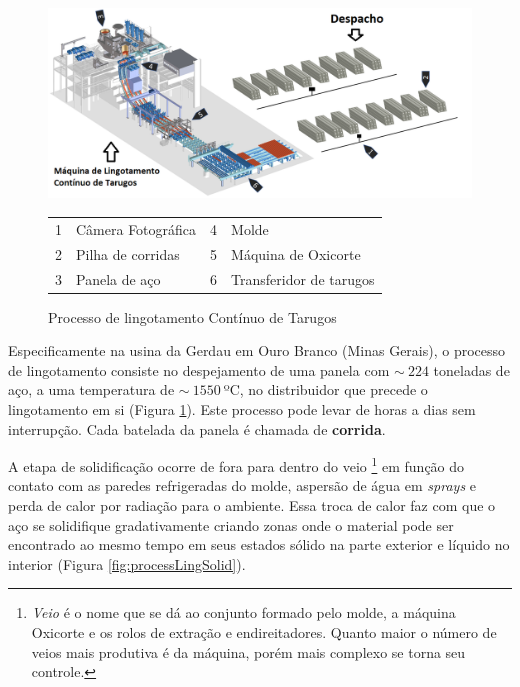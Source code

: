  \begin{figure}[htbp]
	\centering
	\includegraphics[width=1.1\linewidth]{figuras/Steel/process.png}
	\caption{Processo de lingotamento Contínuo de Tarugos}
	\begin{tabular}{r@{: }l r@{: }l}
        1 & Câmera Fotográfica & 4 & Molde \\
        2& Pilha de corridas & 5 & Máquina de Oxicorte \\
        3 & Panela de aço& 6 & Transferidor de tarugos \\
    \end{tabular}
	\label{fig:processLing}
\end{figure}

Especificamente na usina da Gerdau em Ouro Branco (Minas Gerais), o processo de lingotamento consiste no despejamento de uma panela com $\sim~224$ toneladas de aço, a uma temperatura de $\sim~1550~$ºC, no distribuidor que precede o lingotamento em si (Figura \ref{fig:processLing}).
%
Este processo pode levar de horas a dias sem interrupção.
%
Cada batelada da panela é chamada de \textbf{corrida}.


A etapa de solidificação ocorre de fora para dentro do veio
%
\footnote{\textit{Veio} é o nome que se dá ao conjunto formado pelo molde, a máquina Oxicorte e os rolos de extração e endireitadores. Quanto maior o número de veios mais produtiva é da máquina, porém mais complexo se torna seu controle.} 
%
em função do contato com as paredes refrigeradas do molde, aspersão de água em \textit{sprays} e perda de calor por radiação para o ambiente. Essa troca de calor faz com que o aço se solidifique gradativamente criando zonas onde o material pode ser encontrado ao mesmo tempo em seus estados sólido na parte exterior e líquido no interior (Figura \ref{fig:processLingSolid}).

